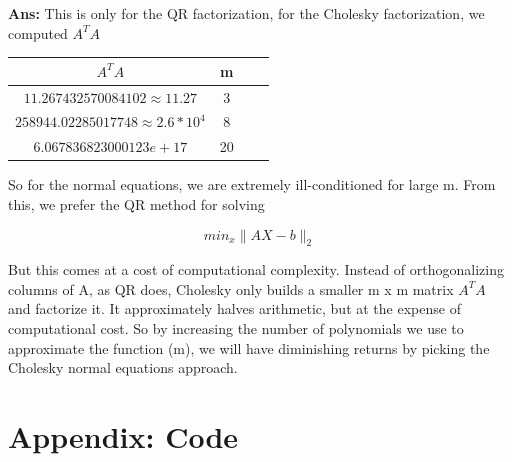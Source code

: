 \documentclass[11pt]{article}
\newenvironment{solbox}
  {\begin{mdframed}[linewidth=1pt,linecolor=black,roundcorner=5pt]
   \noindent\textbf{Ans: }\enspace}
  {\end{mdframed}}
\begin{document}
\begin{solbox}
    This is only for the QR factorization, for the Cholesky factorization, we computed $A^T A$

    \begin{center}
    \begin{tabular}{||c c c c||} 
    \hline
    $ A^TA $  & m \\ [0.5ex] 
    \hline
    $ 11.267432570084102 \approx 11.27  $  & 3 \\ 
    \hline
    $ 258944.02285017748 \approx 2.6 * 10^4 $  & 8 \\
    \hline
    $ 6.067836823000123e+17 $  & 20 \\ 
    \hline
    \end{tabular}
    \end{center}

    So for the normal equations, we are extremely ill-conditioned for large m. From this, we prefer the QR method for solving   

    \[
         min_x \| AX - b\|_2
    \] 

    But this comes at a cost of computational complexity. Instead of orthogonalizing columns of A, as QR does, Cholesky only builds a smaller m x m matrix $ A^TA $ and factorize it. It approximately halves arithmetic, but at the expense of computational cost. So by increasing the number of polynomials we use to approximate the function (m), we will have diminishing returns by picking the Cholesky normal equations approach. 

\end{solbox}


\section{Appendix: Code }
\end{document}
